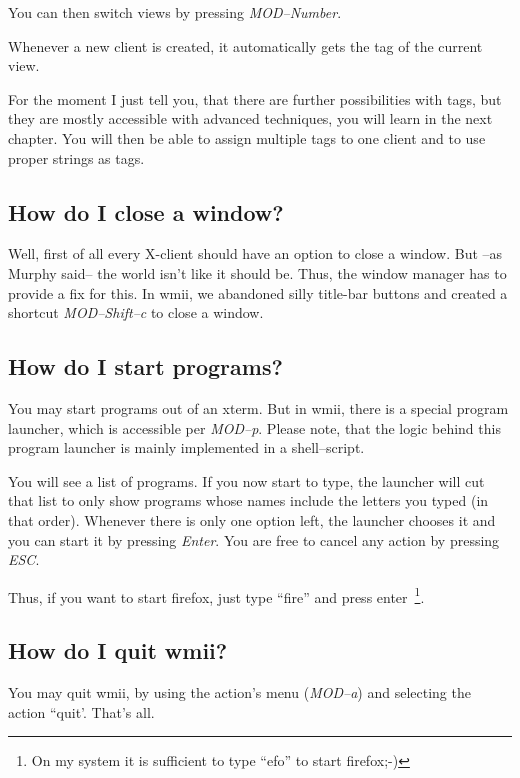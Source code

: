 \documentclass[12pt,a4paper]{article} %
\begin{document}
    You can then switch views by pressing \emph{MOD--Number}.

    Whenever a new client is created, it automatically gets the tag of
    the current view.


    For the moment I just tell you, that there are further
    possibilities with tags, but they are mostly accessible with
    advanced techniques, you will learn in the next chapter. You will
    then be able to assign multiple tags to one client and to use
    proper strings as tags.

  \subsection{How do I close a window?}

    Well, first of all every X-client should have an option to close a
    window. But --as Murphy said-- the world isn't like it should
    be. Thus, the window manager has to provide a fix for this. In
    wmii, we abandoned silly title-bar buttons and created a shortcut
    \emph{MOD--Shift--c} to close a window.

  \subsection{How do I start programs?}

    You may start programs out of an xterm. But in wmii, there is a
    special program launcher, which is accessible per
    \emph{MOD--p}. Please note, that the logic behind this program
    launcher is mainly implemented in a shell--script.

    You will see a list of programs. If you now start to type, the
    launcher will cut that list to only show programs whose names
    include the letters you typed (in that order). Whenever there is
    only one option left, the launcher chooses it and you can start it
    by pressing \emph{Enter}. You are free to cancel any action by
    pressing \emph{ESC}.

    Thus, if you want to start firefox, just type ``fire'' and press
    enter~\footnote{On my system it is sufficient to type ``efo'' to
    start firefox;-)}.

  \subsection{How do I quit wmii?}
    You may quit wmii, by using the action's menu (\emph{MOD--a})
    and selecting the action ``quit'. That's all.
    
\end{document}
